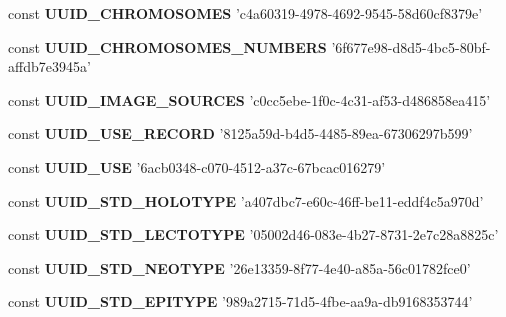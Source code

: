\begin{DoxyCompactItemize}
\item 
\hypertarget{uuids_8php_aff0008267f75849d3e7c97f49341342c}{const {\bfseries U\-U\-I\-D\-\_\-\-C\-H\-R\-O\-M\-O\-S\-O\-M\-E\-S} 'c4a60319-\/4978-\/4692-\/9545-\/58d60cf8379e'}\label{uuids_8php_aff0008267f75849d3e7c97f49341342c}

\item 
\hypertarget{uuids_8php_a2dc813fb5a9f5fe455cdbb340bb32cba}{const {\bfseries U\-U\-I\-D\-\_\-\-C\-H\-R\-O\-M\-O\-S\-O\-M\-E\-S\-\_\-\-N\-U\-M\-B\-E\-R\-S} '6f677e98-\/d8d5-\/4bc5-\/80bf-\/affdb7e3945a'}\label{uuids_8php_a2dc813fb5a9f5fe455cdbb340bb32cba}

\item 
\hypertarget{uuids_8php_a6bbb325e0e862a6c737efa2dcde574dd}{const {\bfseries U\-U\-I\-D\-\_\-\-I\-M\-A\-G\-E\-\_\-\-S\-O\-U\-R\-C\-E\-S} 'c0cc5ebe-\/1f0c-\/4c31-\/af53-\/d486858ea415'}\label{uuids_8php_a6bbb325e0e862a6c737efa2dcde574dd}

\item 
\hypertarget{uuids_8php_ac913a7393eef8cea2e146bf164f792a3}{const {\bfseries U\-U\-I\-D\-\_\-\-U\-S\-E\-\_\-\-R\-E\-C\-O\-R\-D} '8125a59d-\/b4d5-\/4485-\/89ea-\/67306297b599'}\label{uuids_8php_ac913a7393eef8cea2e146bf164f792a3}

\item 
\hypertarget{uuids_8php_a859bc01a0b8fb8cc8aec30e29f3dc76e}{const {\bfseries U\-U\-I\-D\-\_\-\-U\-S\-E} '6acb0348-\/c070-\/4512-\/a37c-\/67bcac016279'}\label{uuids_8php_a859bc01a0b8fb8cc8aec30e29f3dc76e}

\item 
\hypertarget{uuids_8php_a1c52be51c12d6703dbfd4192862d405c}{const {\bfseries U\-U\-I\-D\-\_\-\-S\-T\-D\-\_\-\-H\-O\-L\-O\-T\-Y\-P\-E} 'a407dbc7-\/e60c-\/46ff-\/be11-\/eddf4c5a970d'}\label{uuids_8php_a1c52be51c12d6703dbfd4192862d405c}

\item 
\hypertarget{uuids_8php_ad4bd6b21ff9f383a5583eff66cb29e3a}{const {\bfseries U\-U\-I\-D\-\_\-\-S\-T\-D\-\_\-\-L\-E\-C\-T\-O\-T\-Y\-P\-E} '05002d46-\/083e-\/4b27-\/8731-\/2e7c28a8825c'}\label{uuids_8php_ad4bd6b21ff9f383a5583eff66cb29e3a}

\item 
\hypertarget{uuids_8php_af191ec8c3c5495cf26f1d01a22480b5b}{const {\bfseries U\-U\-I\-D\-\_\-\-S\-T\-D\-\_\-\-N\-E\-O\-T\-Y\-P\-E} '26e13359-\/8f77-\/4e40-\/a85a-\/56c01782fce0'}\label{uuids_8php_af191ec8c3c5495cf26f1d01a22480b5b}

\item 
\hypertarget{uuids_8php_a1bc3cab6b2297773ee286d5aebc68abd}{const {\bfseries U\-U\-I\-D\-\_\-\-S\-T\-D\-\_\-\-E\-P\-I\-T\-Y\-P\-E} '989a2715-\/71d5-\/4fbe-\/aa9a-\/db9168353744'}\label{uuids_8php_a1bc3cab6b2297773ee286d5aebc68abd}


\end{DoxyCompactItemize}
